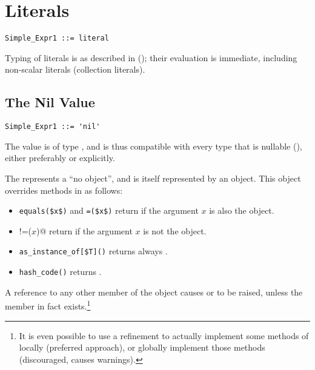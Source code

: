 \section{Literals}

\syntax\begin{lstlisting}
Simple_Expr1 ::= literal
\end{lstlisting}

Typing of literals is as described in (); their evaluation is immediate, including non-scalar literals (collection literals). 






\subsection{The Nil Value}

\syntax\begin{lstlisting}
Simple_Expr1 ::= 'nil'
\end{lstlisting}

The  value is of type , and is thus compatible with every type that is nullable (), either preferably or explicitly.

The  represents a ``no object'', and is itself represented by an object. This object overrides methods in  as follows: 
\begin{itemize}
\item 
\lstinline!equals($x$)! and \lstinline!=($x$)! return  if the argument $x$ is also the  object. 

\item 
\lstinline@!=($x$)@ return  if the argument $x$ is not the  object.

\item
\lstinline[mathescape=false]!as_instance_of[$T]()! returns always . 

\item
\lstinline!hash_code()! returns . 
\end{itemize}

A reference to any other member of the  object causes  or  to be raised, unless the member in fact exists.\footnote{It is even possible to use a refinement to actually implement some methods of  locally (preferred approach), or globally implement those methods (discouraged, causes warnings).} 






